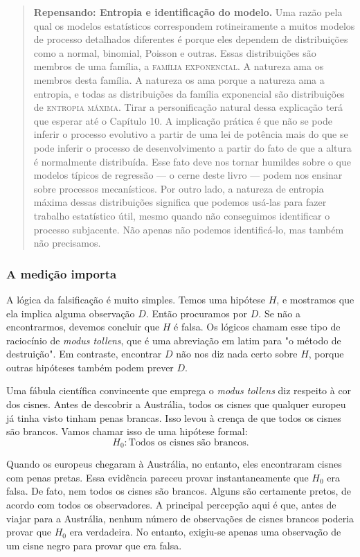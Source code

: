 \begin{quote}
  \textbf{Repensando: Entropia e identificação do modelo.} Uma razão pela qual os modelos estatísticos correspondem rotineiramente a muitos modelos de processo detalhados diferentes é porque eles dependem de distribuições como a normal, binomial, Poisson e outras. Essas distribuições são membros de uma família, a \textsc{família exponencial}. A natureza ama os membros desta família. A natureza os ama porque a natureza ama a entropia, e todas as distribuições da família exponencial são distribuições de \textsc{entropia máxima}. Tirar a personificação natural dessa explicação terá que esperar até o Capítulo 10. A implicação prática é que não se pode inferir o processo evolutivo a partir de uma lei de potência mais do que se pode inferir o processo de desenvolvimento a partir do fato de que a altura é normalmente distribuída. Esse fato deve nos tornar humildes sobre o que modelos típicos de regressão — o cerne deste livro — podem nos ensinar sobre processos mecanísticos. Por outro lado, a natureza de entropia máxima dessas distribuições significa que podemos usá-las para fazer trabalho estatístico útil, mesmo quando não conseguimos identificar o processo subjacente. Não apenas não podemos identificá-lo, mas também não precisamos.
\end{quote}

\subsubsection{A medição importa}

A lógica da falsificação é muito simples. Temos uma hipótese $H$, e mostramos que ela implica alguma observação $D$. Então procuramos por $D$. Se não a encontrarmos, devemos concluir que $H$ é falsa. Os lógicos chamam esse tipo de raciocínio de \textit{modus tollens}, que é uma abreviação em latim para "o método de destruição". Em contraste, encontrar $D$ não nos diz nada certo sobre $H$, porque outras hipóteses também podem prever $D$.

Uma fábula científica convincente que emprega o \textit{modus tollens} diz respeito à cor dos cisnes. Antes de descobrir a Austrália, todos os cisnes que qualquer europeu já tinha visto tinham penas brancas. Isso levou à crença de que todos os cisnes são brancos. Vamos chamar isso de uma hipótese formal:
$$H_0: \text{Todos os cisnes são brancos.}$$

Quando os europeus chegaram à Austrália, no entanto, eles encontraram cisnes com penas pretas. Essa evidência pareceu provar instantaneamente que $H_0$ era falsa. De fato, nem todos os cisnes são brancos. Alguns são certamente pretos, de acordo com todos os observadores. A principal percepção aqui é que, antes de viajar para a Austrália, nenhum número de observações de cisnes brancos poderia provar que $H_0$ era verdadeira. No entanto, exigiu-se apenas uma observação de um cisne negro para provar que era falsa.

